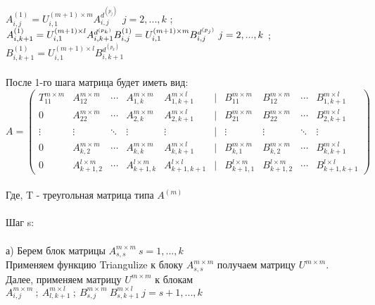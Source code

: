 \documentclass[a4paper,12pt]{article}
\begin{document}
$A_{i,j}^{(1)} = U_{i,1}^{(m+1)\times m} A_{i,j}^{d^{(p_{j})}} \ \ j = 2,...,k$ ;  $A_{i,k+1}^{(1)} = U_{i,1}^{(m+1)\times l} A_{i, k+1}^{d^{(p_{k})}} \\ B_{i,j}^{(1)} = U_{i,1}^{(m+1)\times m} B_{i,j}^{d^{(p_{j})}} \  j = 2,...,k$ ;  $B_{i,k+1}^{(1)} = U_{i,1}^{(m+1)\times l} B_{i, k+1}^{d^{(p_{k})}} $\\\\
После 1-го шага матрица будет иметь вид:
\begin{equation}
A=
  \begin{pmatrix} 
    T_{11}^{m \times m} & A_{12}^{m \times m} & \cdots & A_{1,k}^{m \times m} & A_{1,k+1}^{m \times l} & | & B_{11}^{m \times m} &  B_{12}^{m \times m} & \cdots & B_{1,k+1}^{m \times l}\\
    0 & A_{22}^{m \times m} & \cdots & A_{2,k}^{m \times m} & A_{2,k+1}^{m \times l} & | & B_{21}^{m \times m} &  B_{22}^{m \times m} & \cdots & B_{2,k+1}^{m \times l}\\ 
    \vdots & \vdots & \ddots & \vdots & \vdots & | & \vdots & \vdots & \ddots & \vdots\\ 
    0 & A_{k,2}^{m \times m} & \cdots & A_{k,k}^{m \times m} & A_{k,k+1}^{m \times l} & | & B_{k,1}^{m \times m} &  B_{k,2}^{m \times m} & \cdots & B_{k,k+1}^{m \times l}\\
    0 & A_{k+1,2}^{l \times m} & \cdots & A_{k+1,k}^{l \times m} & A_{k+1,k+1}^{l \times l} & | & B_{k+1,1}^{l \times m} &  B_{k+1,2}^{l \times m} & \cdots & B_{k+1,k+1}^{l \times l} 
  \end{pmatrix}
\end{equation}
\\ Где, T - треугольная матрица типа $A^{(m)}$ \\\\

{\fontsize{15}{15}\selectfont Шаг s:}\\\\


а) Берем блок матрицы  $A_{s,s}^{m\times m} \ s = 1,...,k$\\
Применяем функцию Triangulize к блоку $A_{s,s}^{m\times m} $ получаем матрицу $U^{m\times m}$. \\
Далее, применяем матрицу $U^{m\times m}$ к блокам $A_{i,j}^{m\times m} \ ; \ A_{l,k+1}^{m\times l} \ ; \ B_{s,j}^{m\times m}\ B_{s,k+1}^{m\times l} \ j = s+1,...,k$  \\\\
\end{document}
